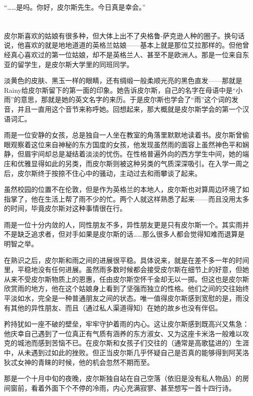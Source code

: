“……是吗。你好，皮尔斯先生。今日真是幸会。”

\section*{}

皮尔斯喜欢的姑娘有很多种，但大体上出不了央格鲁-萨克逊人种的圈子。换句话说，他喜欢的就是地地道道的英格兰姑娘——基本上就是那位艾拉那样的。但他曾经真心喜欢过的第一位姑娘，却不是英格兰人、甚至不是欧洲人。那是一位来自东亚的留学生，是皮尔斯大学里的同班同学。

淡黄色的皮肤、黑玉一样的眼睛，还有绸缎一般柔顺光亮的黑色直发——那就是Rainy给皮尔斯留下的第一面的印象。她告诉皮尔斯，自己的名字在母语中是“小雨”的意思，那就是她的英文名字的来历。于是皮尔斯也学会了“雨”这个词的发音，并且一直用这个音节来称呼她。回想起来，那大概就是皮尔斯学会的第一个汉语词汇。

雨是一位安静的女孩，总是独自一人坐在教室的角落里默默地读着书。皮尔斯曾偷眼观察着这位来自神秘的东方国度的女孩，他发现虽然雨的面容上虽然神色平和娴静，但眉宇间却总是凝结着淡淡的忧伤。在性格普遍外向的西方学生中间，她的端庄和优雅显得如此的另类，而皮尔斯则被这种另类的气质深深吸引。在入学一周之后，皮尔斯终于按捺不住心中的骚动，主动过去和雨攀谈了起来。

虽然校园的位置不在伦敦，但是作为英格兰的本地人，皮尔斯也对算周边环境了如指掌了，他在生活上帮了雨不少的忙。两个人就这样熟悉了起来——而且没用太多的时间，毕竟皮尔斯对这种事情很在行。

雨是一位十分内敛的人，同性朋友不多，异性朋友更是只有皮尔斯一个。其实雨并不是缺乏追求者，但对手如果是皮尔斯的话……那么很多人都会觉得知难而退算是明智之举。

在熟识之后，皮尔斯和雨之间的进展很平稳。具体说来，就是在差不多一年的时间里，平稳地没有任何进展。虽然雨多数时候都会接受皮尔斯在细节上的好意，但她从来不受皮尔斯物质上的恩惠，任由皮尔斯空怀千金却无以一掷。但这也是皮尔斯欣赏雨的地方，他在这个姑娘身上看到了坚强而独立的性格。他们之间的交往始终平淡如水，完全是一种普通朋友之间的状态。唯一值得皮尔斯感到宽慰的是，雨没有其他的异性朋友、而且（通过私人渠道得知）在她的故乡也没有伴侣。

矜持犹如一座不破的壁垒，牢牢守护着雨的内心。这让皮尔斯感到既高兴又焦急：他庆幸自己遇到了一位真正有气质有涵养的东方淑女、又为这座卡米洛一般难以攻克的城池而感到苦恼不已。在皮尔斯和女孩子们交往的（通常是高歌猛进的）生涯中，从未遇到过如此的挫败。但正当皮尔斯几乎怀疑自己是否真的能够得到阿芙洛狄忒女神的青睐的时候，他的机会忽然不期而至。

那是一个十月中旬的夜晚，皮尔斯独自站在自己空落（依旧是没有私人物品）的房间窗前，看着外面下个不停的冷雨，内心充满寂寥、甚至想写一首十四行诗。

